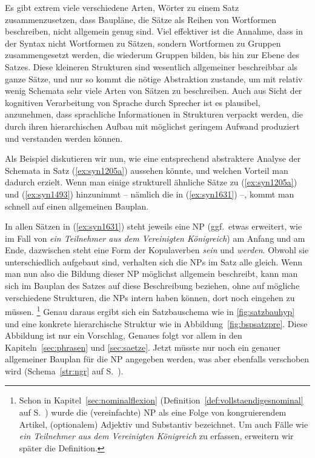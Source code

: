 Es gibt extrem viele verschiedene Arten, Wörter zu einem Satz zusammenzusetzen, dass Baupläne, die Sätze als Reihen von Wortformen beschreiben, nicht allgemein genug sind.
Viel effektiver ist die Annahme, dass in der Syntax nicht Wortformen zu Sätzen, sondern Wortformen zu Gruppen zusammengesetzt werden, die wiederum Gruppen bilden, bis hin zur Ebene des Satzes.
Diese kleineren Strukturen sind wesentlich allgemeiner beschreibbar als ganze Sätze, und nur so kommt die nötige Abstraktion zustande, um mit relativ wenig Schemata sehr viele Arten von Sätzen zu beschreiben.
Auch aus Sicht der kognitiven Verarbeitung von Sprache durch Sprecher ist es plausibel, anzunehmen, dass sprachliche Informationen in Strukturen verpackt werden, die durch ihren hierarchischen Aufbau mit möglichst geringem Aufwand produziert und verstanden werden können.

Als Beispiel diskutieren wir nun, wie eine entsprechend abstraktere Analyse der Schemata in Satz (\ref{ex:syn1205a}) aussehen könnte, und welchen Vorteil man dadurch erzielt.
Wenn man einige strukturell ähnliche Sätze zu (\ref{ex:syn1205a}) und (\ref{ex:syn1493}) hinzunimmt -- nämlich die in (\ref{ex:syn1631}) --, kommt man schnell auf einen allgemeinen Bauplan.

\begin{exe}
  \ex\label{ex:syn1631}
  \begin{xlist}
  \end{xlist}
\end{exe}

In allen Sätzen in (\ref{ex:syn1631}) steht jeweils eine NP (ggf.\ etwas erweitert, wie im Fall von \textit{ein Teilnehmer aus dem Vereinigten Königreich}) am Anfang und am Ende, dazwischen steht eine Form der Kopulaverben \textit{sein} und \textit{werden}.
Obwohl sie unterschiedlich aufgebaut sind, verhalten sich die NPs im Satz alle gleich.
Wenn man nun also die Bildung dieser NP möglichst allgemein beschreibt, kann man sich im Bauplan des Satzes auf diese Beschreibung beziehen, ohne auf mögliche verschiedene Strukturen, die NPs intern haben können, dort noch eingehen zu müssen.%
\footnote{Schon in Kapitel~\ref{sec:nominalflexion} (Definition~\ref{def:vollstaendigesnominal} auf S.~\pageref{def:vollstaendigesnominal}) wurde die (vereinfachte) NP als eine Folge von kongruierendem Artikel, (optionalem) Adjektiv und Substantiv bezeichnet.
Um auch Fälle wie \textit{ein Teilnehmer aus dem Vereinigten Königreich} zu erfassen, erweitern wir später die Definition.}
Genau daraus ergibt sich ein Satzbauschema wie in \ref{fig:satzbauhyp} und eine konkrete hierarchische Struktur wie in Abbildung~\ref{fig:bspsatzpre}.
Diese Abbildung ist nur ein Vorschlag, Genaues folgt vor allem in den Kapiteln~\ref{sec:phrasen} und \ref{sec:saetze}.
Jetzt müsste nur noch ein genauer allgemeiner Bauplan für die NP angegeben werden, was aber ebenfalls verschoben wird (Schema~\ref{str:ngr} auf S.~\pageref{str:ngr}).

